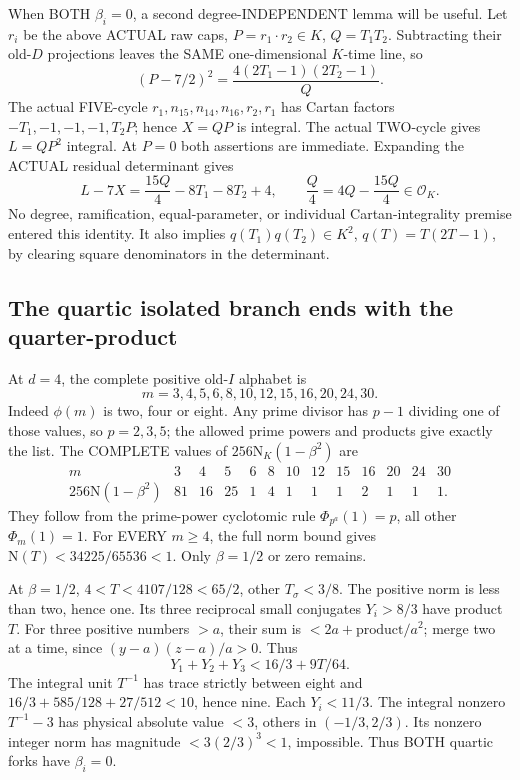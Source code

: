 \documentclass[11pt]{article}
\begin{document}
When BOTH \(\beta_i=0\), a second
degree-INDEPENDENT lemma will be useful.
Let \(r_i\) be the above ACTUAL raw
caps, \(P=r_1\cdot r_2\in K\),
\(Q=T_1T_2\).
Subtracting their old-\(D\) projections
leaves the SAME one-dimensional
\(K\)-time line, so
\[
                   (P-7/2)^2=
                     {\frac{4(2T_1-1)(2T_2-1)}{Q}}.
\]
The actual FIVE-cycle
\(r_1,n_{15},n_{14},n_{16},r_2,r_1\)
has Cartan factors
\(-T_1,-1,-1,-1,T_2P\);
hence \(X=QP\) is integral.
The actual TWO-cycle gives
\(L=QP^2\) integral.
At \(P=0\) both assertions are immediate.
Expanding the ACTUAL residual determinant
gives
\[
 L-7X={\frac{15Q}{4}}-8T_1-8T_2+4,\qquad
          {\frac{Q}{4}}=4Q-{\frac{15Q}{4}}\in\mathcal O_K .
\tag{D16Iquarter}\label{eq:arithD16Iquarterproduct}
\]
No degree, ramification, equal-parameter,
or individual Cartan-integrality premise
entered this identity.
It also implies
\(q(T_1)q(T_2)\in K^2\),
\(q(T)=T(2T-1)\), by clearing square
denominators in the determinant.

\subsection{The quartic isolated branch ends with the quarter-product}
\label{app:arithD16Iquartic}

At \(d=4\), the complete positive
old-\(I\) alphabet is
\[
                m=3,4,5,6,8,10,12,15,16,20,24,30 .
\]
Indeed \(\phi(m)\) is two, four or
eight.
Any prime divisor has \(p-1\) dividing
one of those values, so \(p=2,3,5\);
the allowed prime powers and products
give exactly the list.
The COMPLETE values of
\(256\mathrm N_K(1-\beta^2)\)
are
\[
\begin{array}{c|rrrrrrrrrrrr}
m&3&4&5&6&8&10&12&15&16&20&24&30\\ \hline
256\mathrm N(1-\beta^2)&81&16&25&1&4&1&1&1&2&1&1&1 .
\end{array}
\]
They follow from the prime-power
cyclotomic rule \(\Phi_{p^a}(1)=p\),
all other \(\Phi_m(1)=1\).
For EVERY \(m\ge4\), the full norm
bound gives
\(\mathrm N(T)<34225/65536<1\).
Only \(\beta=1/2\) or zero remains.

At \(\beta=1/2\),
\(4<T<4107/128<65/2\), other
\(T_\sigma<3/8\).
The positive norm is less than two,
hence one.
Its three reciprocal small conjugates
\(Y_i>8/3\) have product \(T\).
For three positive numbers \(>a\),
their sum is \(<2a+\text{product}/a^2\);
merge two at a time, since
\((y-a)(z-a)/a>0\).
Thus
\[
                    Y_1+Y_2+Y_3<16/3+9T/64 .
\]
The integral unit \(T^{-1}\) has trace
strictly between eight and
\(16/3+585/128+27/512<10\), hence nine.
Each \(Y_i<11/3\).
The integral nonzero \(T^{-1}-3\)
has physical absolute value \(<3\),
others in \((-1/3,2/3)\).
Its nonzero integer norm has magnitude
\(<3(2/3)^3<1\), impossible.
Thus BOTH quartic forks have
\(\beta_i=0\).
\end{document}
